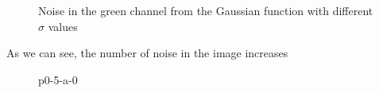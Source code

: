 \documentclass[12pt,a4paper]{article}
\begin{document}
\begin{figure}[!h]
	\caption{Noise in the green channel from the Gaussian function with different $\sigma$ values}%
	\label{fig:green-sigma}%
\end{figure}

As we can see, the number of noise in the image increases 

\begin{figure}[!h]
	\centering
	{%
		\setlength{\fboxsep}{1pt}%
		\setlength{\fboxrule}{1pt}%
	}%
	\caption{p0-5-a-0}
	\label{fig:p0-5-a-0}
\end{figure}
\end{document}
